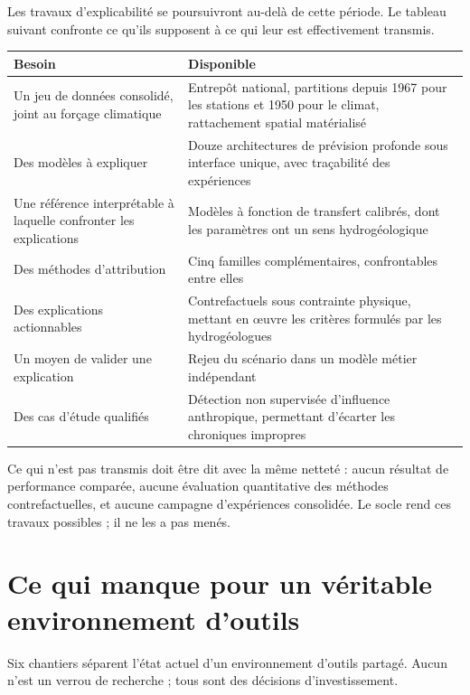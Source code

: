 Les travaux d'explicabilité se poursuivront au-delà de cette période. Le tableau suivant
confronte ce qu'ils supposent à ce qui leur est effectivement transmis.

\begin{center}
\begin{tabularx}{\textwidth}{@{}p{4.6cm}X@{}}
\toprule
\textbf{Besoin} & \textbf{Disponible} \\
\midrule
Un jeu de données consolidé, joint au forçage climatique & Entrepôt national, partitions depuis
1967 pour les stations et 1950 pour le climat, rattachement spatial matérialisé \\
Des modèles à expliquer & Douze architectures de prévision profonde sous interface unique, avec
traçabilité des expériences \\
Une référence interprétable à laquelle confronter les explications & Modèles à fonction de
transfert calibrés, dont les paramètres ont un sens hydrogéologique \\
Des méthodes d'attribution & Cinq familles complémentaires, confrontables entre elles \\
Des explications actionnables & Contrefactuels sous contrainte physique, mettant en œuvre les
critères formulés par les hydrogéologues \\
Un moyen de valider une explication & Rejeu du scénario dans un modèle métier indépendant \\
Des cas d'étude qualifiés & Détection non supervisée d'influence anthropique, permettant
d'écarter les chroniques impropres \\
\bottomrule
\end{tabularx}
\end{center}

Ce qui n'est pas transmis doit être dit avec la même netteté : aucun résultat de performance
comparée, aucune évaluation quantitative des méthodes contrefactuelles, et aucune campagne
d'expériences consolidée. Le socle rend ces travaux possibles ; il ne les a pas menés.

\section{Ce qui manque pour un véritable environnement d'outils}

Six chantiers
séparent l'état actuel d'un environnement d'outils partagé. Aucun n'est un verrou de recherche ;
tous sont des décisions d'investissement.

